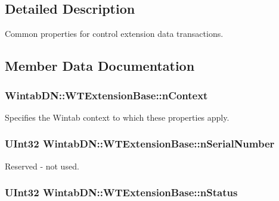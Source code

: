 \subsection{Detailed Description}
Common properties for control extension data transactions. 

\subsection{Member Data Documentation}
\hypertarget{struct_wintab_d_n_1_1_w_t_extension_base_a6cb92705951cd2986eb41a839d6a4262}{
\subsubsection[{nContext}]{ {\bf WintabDN::WTExtensionBase::nContext}}}
\label{struct_wintab_d_n_1_1_w_t_extension_base_a6cb92705951cd2986eb41a839d6a4262}


Specifies the Wintab context to which these properties apply. 

\hypertarget{struct_wintab_d_n_1_1_w_t_extension_base_acf18c03020a46eaec34c90454849b710}{
\subsubsection[{nSerialNumber}]{\setlength{\rightskip}{0pt plus 5cm}UInt32 {\bf WintabDN::WTExtensionBase::nSerialNumber}}}
\label{struct_wintab_d_n_1_1_w_t_extension_base_acf18c03020a46eaec34c90454849b710}


Reserved -\/ not used. 

\hypertarget{struct_wintab_d_n_1_1_w_t_extension_base_aab3d8aef441f40cf947ee5dd34e9b15b}{
\subsubsection[{nStatus}]{\setlength{\rightskip}{0pt plus 5cm}UInt32 {\bf WintabDN::WTExtensionBase::nStatus}}}
\label{struct_wintab_d_n_1_1_w_t_extension_base_aab3d8aef441f40cf947ee5dd34e9b15b}


